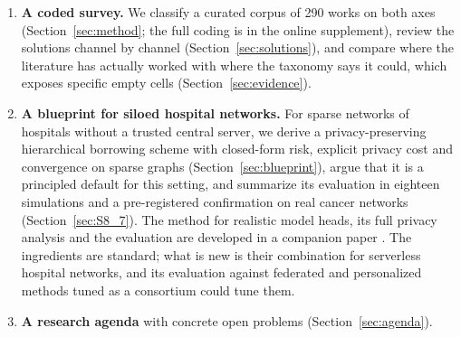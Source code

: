 \documentclass[acmsmall,screen,review]{acmart}
\theoremstyle{acmdefinition}
\begin{document}
\begin{enumerate}[leftmargin=*]
\begin{figure}[t]
\caption{Structure of the paper. The definition of Section~\ref{sec:definition} produces the two axes of the taxonomy, which serve as the coding scheme of the survey and shape the design of the blueprint.}
\label{fig:structure}
\end{figure}
\item \textbf{A coded survey.} We classify a curated corpus of 290 works on both axes (Section~\ref{sec:method}; the full coding is in the online supplement), review the solutions channel by channel (Section~\ref{sec:solutions}), and compare where the literature has actually worked with where the taxonomy says it could, which exposes specific empty cells (Section~\ref{sec:evidence}).
\item \textbf{A blueprint for siloed hospital networks.} For sparse networks of hospitals without a trusted central server, we derive a privacy-preserving hierarchical borrowing scheme with closed-form risk, explicit privacy cost and convergence on sparse graphs (Section~\ref{sec:blueprint}), argue that it is a principled default for this setting, and summarize its evaluation in eighteen simulations and a pre-registered confirmation on real cancer networks (Section~\ref{sec:S8_7}). The method for realistic model heads, its full privacy analysis and the evaluation are developed in a companion paper \cite{simoes2026ghb}. The ingredients are standard; what is new is their combination for serverless hospital networks, and its evaluation against federated and personalized methods tuned as a consortium could tune them.
\item \textbf{A research agenda} with concrete open problems (Section~\ref{sec:agenda}).
\end{enumerate}
\end{document}
